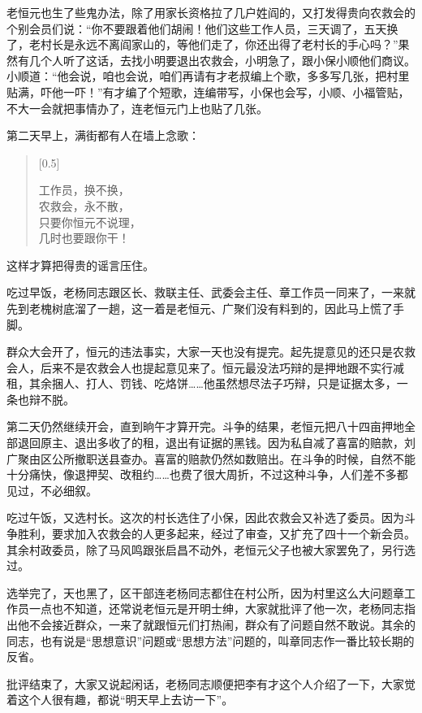 \documentclass[12pt,UTF-8,openany]{ctexbook}
\begin{document}
\begin{large}
    老恒元也生了些鬼办法，除了用家长资格拉了几户姓阎的，又打发得贵向农救会的个别会员们说：“你不要跟着他们胡闹！他们这些工作人员，三天调了，五天换了，老村长是永远不离阎家山的，等他们走了，你还出得了老村长的手心吗？”果然有几个人听了这话，去找小明要退出农救会，小明急了，跟小保小顺他们商议。小顺道：“他会说，咱也会说，咱们再请有才老叔编上个歌，多多写几张，把村里贴满，吓他一吓！”有才编了个短歌，连编带写，小保也会写，小顺、小福管贴，不大一会就把事情办了，连老恒元门上也贴了几张。
    
    第二天早上，满街都有人在墙上念歌：
    
    \begin{verse}[0.5\linewidth]
    
    工作员，换不换，\\农救会，永不散，\\只要你恒元不说理，\\几时也要跟你干！
    
    \end{verse}
    
    这样才算把得贵的谣言压住。
    
    吃过早饭，老杨同志跟区长、救联主任、武委会主任、章工作员一同来了，一来就先到老槐树底溜了一趟，这一着是老恒元、广聚们没有料到的，因此马上慌了手脚。
    
    群众大会开了，恒元的违法事实，大家一天也没有提完。起先提意见的还只是农救会人，后来不是农救会人也提起意见来了。恒元最没法巧辩的是押地跟不实行减租，其余捆人、打人、罚钱、吃烙饼……他虽然想尽法子巧辩，只是证据太多，一条也辩不脱。
    
    第二天仍然继续开会，直到晌午才算开完。斗争的结果，老恒元把八十四亩押地全部退回原主、退出多收了的租，退出有证据的黑钱。因为私自减了喜富的赔款，刘广聚由区公所撤职送县查办。喜富的赔款仍然如数赔出。在斗争的时候，自然不能十分痛快，像退押契、改租约……也费了很大周折，不过这种斗争，人们差不多都见过，不必细叙。
    
    吃过午饭，又选村长。这次的村长选住了小保，因此农救会又补选了委员。因为斗争胜利，要求加入农救会的人更多起来，经过了审查，又扩充了四十一个新会员。其余村政委员，除了马风鸣跟张启昌不动外，老恒元父子也被大家罢免了，另行选过。
    
    选举完了，天也黑了，区干部连老杨同志都住在村公所，因为村里这么大问题章工作员一点也不知道，还常说老恒元是开明士绅，大家就批评了他一次，老杨同志指出他不会接近群众，一来了就跟恒元们打热闹，群众有了问题自然不敢说。其余的同志，也有说是“思想意识”问题或“思想方法”问题的，叫章同志作一番比较长期的反省。
    
    批评结束了，大家又说起闲话，老杨同志顺便把李有才这个人介绍了一下，大家觉着这个人很有趣，都说“明天早上去访一下”。
    
\end{large}
\end{document}
